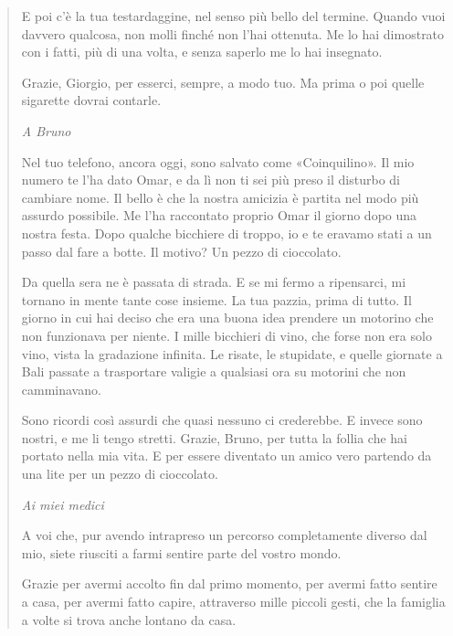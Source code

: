 \begin{quote}
E poi c'è la tua testardaggine, nel senso più bello del termine. Quando vuoi davvero qualcosa, non molli finché non l'hai ottenuta. Me lo hai dimostrato con i fatti, più di una volta, e senza saperlo me lo hai insegnato.\par

Grazie, Giorgio, per esserci, sempre, a modo tuo. Ma prima o poi quelle sigarette dovrai contarle.\par

\clearpage
\vspace{5mm}
\textit{A Bruno}\par
\vspace{2mm}
Nel tuo telefono, ancora oggi, sono salvato come «Coinquilino». Il mio numero te l'ha dato Omar, e da lì non ti sei più preso il disturbo di cambiare nome. Il bello è che la nostra amicizia è partita nel modo più assurdo possibile. Me l'ha raccontato proprio Omar il giorno dopo una nostra festa. Dopo qualche bicchiere di troppo, io e te eravamo stati a un passo dal fare a botte. Il motivo? Un pezzo di cioccolato.\par

Da quella sera ne è passata di strada. E se mi fermo a ripensarci, mi tornano in mente tante cose insieme. La tua pazzia, prima di tutto. Il giorno in cui hai deciso che era una buona idea prendere un motorino che non funzionava per niente. I mille bicchieri di vino, che forse non era solo vino, vista la gradazione infinita. Le risate, le stupidate, e quelle giornate a Bali passate a trasportare valigie a qualsiasi ora su motorini che non camminavano.\par

Sono ricordi così assurdi che quasi nessuno ci crederebbe. E invece sono nostri, e me li tengo stretti. Grazie, Bruno, per tutta la follia che hai portato nella mia vita. E per essere diventato un amico vero partendo da una lite per un pezzo di cioccolato.\par


\vspace{5mm}
\textit{Ai miei medici}\par
\vspace{2mm}
A voi che, pur avendo intrapreso un percorso completamente diverso dal mio, siete riusciti a farmi sentire parte del vostro mondo.\par

Grazie per avermi accolto fin dal primo momento, per avermi fatto sentire a casa, per avermi fatto capire, attraverso mille piccoli gesti, che la famiglia a volte si trova anche lontano da casa.\par


\end{quote}
